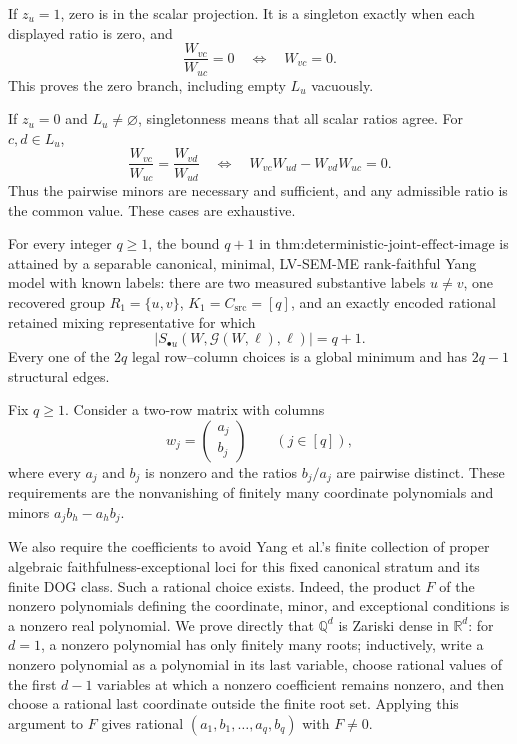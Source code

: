 If \(z_u=1\), zero is in the scalar projection.  It is a singleton exactly when each displayed ratio is zero, and
\[
\frac{W_{vc}}{W_{uc}}=0
\quad\Longleftrightarrow\quad
W_{vc}=0.
\]
This proves the zero branch, including empty \(L_u\) vacuously.

If \(z_u=0\) and \(L_u\ne\varnothing\), singletonness means that all scalar ratios agree.  For \(c,d\in L_u\),
\[
\frac{W_{vc}}{W_{uc}}=\frac{W_{vd}}{W_{ud}}
\quad\Longleftrightarrow\quad
W_{vc}W_{ud}-W_{vd}W_{uc}=0.
\]
Thus the pairwise minors are necessary and sufficient, and any admissible ratio is the common value.  These cases are exhaustive.

For every integer \(q\ge1\), the bound \(q+1\) in \(\text{thm:deterministic-joint-effect-image}\) is attained by a separable canonical, minimal, LV-SEM-ME rank-faithful Yang model with known labels: there are two measured substantive labels \(u\ne v\), one recovered group \(R_1=\{u,v\}\), \(K_1=C_{\mathrm{src}}=[q]\), and an exactly encoded rational retained mixing representative for which
\[
|S_{\bullet u}(W,\mathcal G(W,\ell),\ell)|=q+1.
\]
Every one of the \(2q\) legal row--column choices is a global minimum and has \(2q-1\) structural edges.

Fix \(q\ge1\).  Consider a two-row matrix with columns
\[
w_j=\begin{pmatrix}a_j\\b_j\end{pmatrix}
\qquad(j\in[q]),
\]
where every \(a_j\) and \(b_j\) is nonzero and the ratios \(b_j/a_j\) are pairwise distinct.  These requirements are the nonvanishing of finitely many coordinate polynomials and minors \(a_jb_h-a_hb_j\).

We also require the coefficients to avoid Yang et al.'s finite collection of proper algebraic faithfulness-exceptional loci for this fixed canonical stratum and its finite DOG class.  Such a rational choice exists.  Indeed, the product \(F\) of the nonzero polynomials defining the coordinate, minor, and exceptional conditions is a nonzero real polynomial.  We prove directly that \(\mathbb Q^d\) is Zariski dense in \(\mathbb R^d\): for \(d=1\), a nonzero polynomial has only finitely many roots; inductively, write a nonzero polynomial as a polynomial in its last variable, choose rational values of the first \(d-1\) variables at which a nonzero coefficient remains nonzero, and then choose a rational last coordinate outside the finite root set.  Applying this argument to \(F\) gives rational \((a_1,b_1,\ldots,a_q,b_q)\) with \(F\ne0\).

